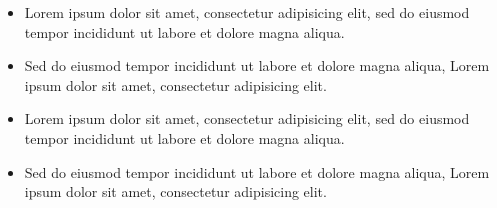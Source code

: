 \lipsum[36]


\lipsum[17-18]


\lipsum[9]


\lipsum[7-8]
\begin{summary}
  \begin{itemize}
  \item Lorem ipsum dolor sit amet, consectetur adipisicing elit, sed do eiusmod tempor incididunt ut labore et dolore magna aliqua.
  \item Sed do eiusmod tempor incididunt ut labore et dolore magna aliqua, Lorem ipsum dolor sit amet, consectetur adipisicing elit.
  \item Lorem ipsum dolor sit amet, consectetur adipisicing elit, sed do eiusmod tempor incididunt ut labore et dolore magna aliqua.
  \item Sed do eiusmod tempor incididunt ut labore et dolore magna aliqua, Lorem ipsum dolor sit amet, consectetur adipisicing elit.
  \end{itemize}
\end{summary}

